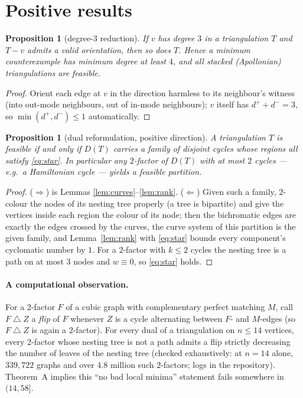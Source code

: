 \documentclass[11pt]{article}
\newtheorem{proposition}[theorem]{Proposition}
\theoremstyle{remark}
\newcommand{\dout}{d^{+}}
\newcommand{\din}{d^{-}}
\begin{document}
\section{Positive results}\label{sec:positive}

\begin{proposition}[degree-$3$ reduction]\label{prop:deg3}
If $v$ has degree $3$ in a triangulation $T$ and $T-v$ admits a valid
orientation, then so does $T$. Hence a minimum counterexample has
minimum degree at least $4$, and all stacked (Apollonian)
triangulations are feasible.
\end{proposition}

\begin{proof}
Orient each edge at $v$ in the direction harmless to its neighbour's
witness (into out-mode neighbours, out of in-mode neighbours); $v$
itself has $\dout+\din=3$, so $\min(\dout,\din)\le 1$ automatically.
\end{proof}

\begin{proposition}[dual reformulation, positive direction]
\label{prop:dual}
A triangulation $T$ is feasible if and only if $D(T)$ carries a family
of disjoint cycles whose regions all satisfy \eqref{eq:star}. In
particular any $2$-factor of $D(T)$ with at most $2$ cycles --- e.g.\ a
Hamiltonian cycle --- yields a feasible partition.
\end{proposition}

\begin{proof}
($\Rightarrow$) is Lemmas \ref{lem:curves}--\ref{lem:rank}.
($\Leftarrow$) Given such a family, $2$-colour the nodes of its nesting
tree properly (a tree is bipartite) and give the vertices inside each
region the colour of its node; then the bichromatic edges are exactly
the edges crossed by the curves, the curve system of this partition is
the given family, and Lemma~\ref{lem:rank} with \eqref{eq:star} bounds
every component's cyclomatic number by $1$. For a $2$-factor with
$k\le 2$ cycles the nesting tree is a path on at most $3$ nodes and
$w\equiv 0$, so \eqref{eq:star} holds.
\end{proof}

\paragraph{A computational observation.}
For a $2$-factor $F$ of a cubic graph with complementary perfect
matching $M$, call $F\bigtriangleup Z$ a \emph{flip} of $F$ whenever
$Z$ is a cycle alternating between $F$- and $M$-edges (so
$F\bigtriangleup Z$ is again a $2$-factor). For every dual of a
triangulation on $n\le 14$ vertices, every $2$-factor whose nesting
tree is not a path admits a flip strictly decreasing the number of
leaves of the nesting tree (checked exhaustively: at $n=14$ alone,
$339{,}722$ graphs and over $4.8$ million such $2$-factors; logs in
the repository). Theorem~A implies this ``no bad local minima''
statement fails somewhere in $(14,58]$.
\end{document}
